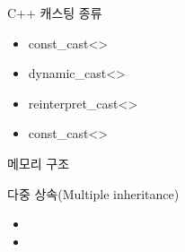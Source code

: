 \documentclass[10pt]{beamer}
\begin{document}
\begin{frame}{C++ 캐스팅 종류}
    \begin{itemize}
        \item const\_cast<>
        \item dynamic\_cast<>
        \item reinterpret\_cast<>
        \item const\_cast<>
    \end{itemize}
\end{frame}






\begin{frame}[fragile]{메모리 구조}

\end{frame}    



\begin{frame}{다중 상속(Multiple inheritance)}
    \begin{itemize}
        \item 
        \item 
    \end{itemize}
\end{frame}
\end{document}
